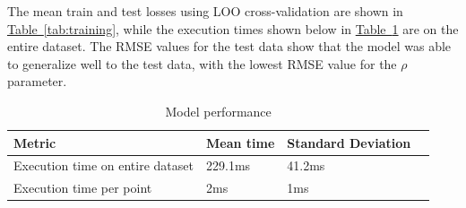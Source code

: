 The mean train and test losses using LOO cross-validation are shown in \hyperref[tab:training]{Table~\ref*{tab:training}},
while the execution times shown below in \hyperref[tab:performance]{Table~\ref*{tab:performance}} are on the entire dataset.
The RMSE values for the test data show that the model was able to generalize well to the test data, with the lowest RMSE value for the $\rho$ parameter.

\begin{table}[!ht]
    \centering
    \begin{tabular}{|l|l|l|l|}
        \hline
        Metric                           & Mean time & Standard Deviation \\ \hline
        Execution time on entire dataset & 229.1ms   & 41.2ms             \\ \hline
        Execution time per point         & 2ms       & 1ms                \\ \hline
    \end{tabular}%
    \captionsetup{skip=10pt} %
    \caption{Model performance}
    \label{tab:performance}
\end{table}


